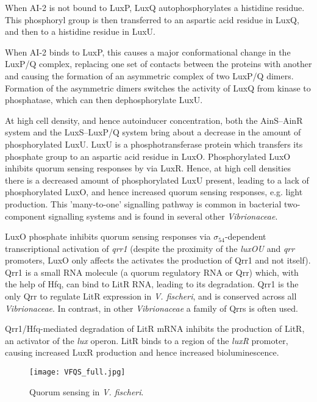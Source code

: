 When AI-2  is not bound to LuxP, LuxQ autophosphorylates a histidine residue\cite{Neiditch2006}. This phosphoryl group is then transferred to an aspartic acid residue in LuxQ, and then to a histidine residue in LuxU. 

When AI-2  binds to LuxP, this causes a major conformational change in the LuxP/Q complex, replacing one set of contacts between the proteins with another\cite{Neiditch} and causing the formation of an asymmetric complex of two LuxP/Q dimers. Formation of the asymmetric dimers switches the activity of LuxQ from kinase to phosphatase, which can then dephosphorylate LuxU.

At high cell density, and hence autoinducer concentration, both the AinS–AinR system and the LuxS–LuxP/Q system bring about a decrease in the amount of phosphorylated LuxU. LuxU is a phosphotransferase protein which transfers its phosphate group to an aspartic acid residue in LuxO\cite{Freeman1999}. Phosphorylated LuxO inhibits quorum sensing responses by via LuxR. Hence, at high cell densities there is a decreased amount of phosphorylated LuxU present, leading to a lack of phosphorylated LuxO, and hence increased quorum sensing responses, e.g. light production. This 'many-to-one' signalling pathway is common in bacterial two-component signalling systems \cite{Laub2007} and is found in several other \textit{Vibrionaceae}\cite{Milton2006}.

LuxO phosphate inhibits quorum sensing responses via $\sigma_{54}$-dependent transcriptional activation of \textit{qrr1}\cite{Miyamoto2000,Miyashiro2010} (despite the proximity of the \textit{luxOU} and \textit{qrr} promoters, LuxO only affects the activates the production of Qrr1 and not itself\cite{Lilley2000}). Qrr1 is a small RNA molecule (a quorum regulatory RNA or Qrr) which, with the help of Hfq, can bind to LitR RNA, leading to its degradation\cite{Miyashiro2010}. Qrr1 is the only Qrr to regulate LitR expression in \textit{V. fischeri}, and is conserved across all \textit{Vibrionaceae}\cite{Miyashiro2010}. In contrast, in other \textit{Vibrionaceae} a family of Qrrs is often used\cite{Lenz2004}.

Qrr1/Hfq-mediated degradation of LitR mRNA inhibits the production of LitR, an activator of the \textit{lux} operon. LitR binds to a region of the \textit{luxR} promoter, causing increased LuxR production and hence increased bioluminescence\cite{Fidopiastis2002}.


\begin{figure}[H]
	\begin{center}
		\texttt{[image: VFQS\_full.jpg]}
		\caption{Quorum sensing in \textit{V. fischeri}. \label{fig:VFQS_full}}
	\end{center}
\end{figure}

